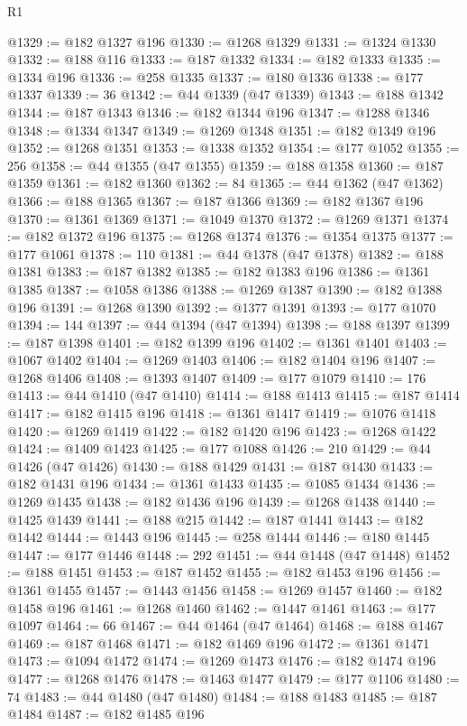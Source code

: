 \begin{lexlean}{R1}
\begin{coremodule}
@1329 := @182 @1327 @196
@1330 := @1268 @1329
@1331 := @1324 @1330
@1332 := @188 @116
@1333 := @187 @1332
@1334 := @182 @1333
@1335 := @1334 @196
@1336 := @258 @1335
@1337 := @180 @1336
@1338 := @177 @1337
@1339 := 36
@1342 := @44 @1339 (@47 @1339)
@1343 := @188 @1342
@1344 := @187 @1343
@1346 := @182 @1344 @196
@1347 := @1288 @1346
@1348 := @1334 @1347
@1349 := @1269 @1348
@1351 := @182 @1349 @196
@1352 := @1268 @1351
@1353 := @1338 @1352
@1354 := @177 @1052
@1355 := 256
@1358 := @44 @1355 (@47 @1355)
@1359 := @188 @1358
@1360 := @187 @1359
@1361 := @182 @1360
@1362 := 84
@1365 := @44 @1362 (@47 @1362)
@1366 := @188 @1365
@1367 := @187 @1366
@1369 := @182 @1367 @196
@1370 := @1361 @1369
@1371 := @1049 @1370
@1372 := @1269 @1371
@1374 := @182 @1372 @196
@1375 := @1268 @1374
@1376 := @1354 @1375
@1377 := @177 @1061
@1378 := 110
@1381 := @44 @1378 (@47 @1378)
@1382 := @188 @1381
@1383 := @187 @1382
@1385 := @182 @1383 @196
@1386 := @1361 @1385
@1387 := @1058 @1386
@1388 := @1269 @1387
@1390 := @182 @1388 @196
@1391 := @1268 @1390
@1392 := @1377 @1391
@1393 := @177 @1070
@1394 := 144
@1397 := @44 @1394 (@47 @1394)
@1398 := @188 @1397
@1399 := @187 @1398
@1401 := @182 @1399 @196
@1402 := @1361 @1401
@1403 := @1067 @1402
@1404 := @1269 @1403
@1406 := @182 @1404 @196
@1407 := @1268 @1406
@1408 := @1393 @1407
@1409 := @177 @1079
@1410 := 176
@1413 := @44 @1410 (@47 @1410)
@1414 := @188 @1413
@1415 := @187 @1414
@1417 := @182 @1415 @196
@1418 := @1361 @1417
@1419 := @1076 @1418
@1420 := @1269 @1419
@1422 := @182 @1420 @196
@1423 := @1268 @1422
@1424 := @1409 @1423
@1425 := @177 @1088
@1426 := 210
@1429 := @44 @1426 (@47 @1426)
@1430 := @188 @1429
@1431 := @187 @1430
@1433 := @182 @1431 @196
@1434 := @1361 @1433
@1435 := @1085 @1434
@1436 := @1269 @1435
@1438 := @182 @1436 @196
@1439 := @1268 @1438
@1440 := @1425 @1439
@1441 := @188 @215
@1442 := @187 @1441
@1443 := @182 @1442
@1444 := @1443 @196
@1445 := @258 @1444
@1446 := @180 @1445
@1447 := @177 @1446
@1448 := 292
@1451 := @44 @1448 (@47 @1448)
@1452 := @188 @1451
@1453 := @187 @1452
@1455 := @182 @1453 @196
@1456 := @1361 @1455
@1457 := @1443 @1456
@1458 := @1269 @1457
@1460 := @182 @1458 @196
@1461 := @1268 @1460
@1462 := @1447 @1461
@1463 := @177 @1097
@1464 := 66
@1467 := @44 @1464 (@47 @1464)
@1468 := @188 @1467
@1469 := @187 @1468
@1471 := @182 @1469 @196
@1472 := @1361 @1471
@1473 := @1094 @1472
@1474 := @1269 @1473
@1476 := @182 @1474 @196
@1477 := @1268 @1476
@1478 := @1463 @1477
@1479 := @177 @1106
@1480 := 74
@1483 := @44 @1480 (@47 @1480)
@1484 := @188 @1483
@1485 := @187 @1484
@1487 := @182 @1485 @196

\end{coremodule}
\end{lexlean}
